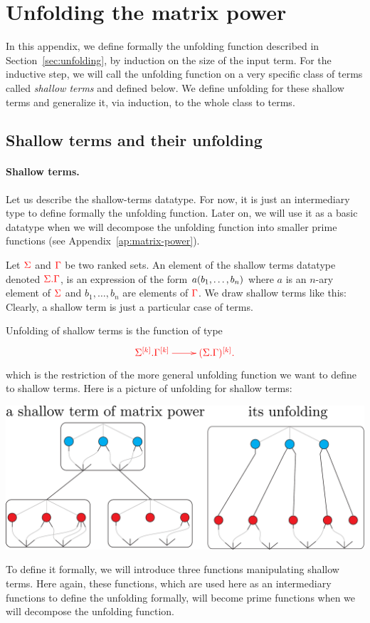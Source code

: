 \section{Unfolding the matrix power} 
\label{sec:appendix-unfold}
In this appendix, we define formally the unfolding function described in Section~\ref{sec:unfolding}, by induction on the size of the input term. For the inductive step, we will call the unfolding function on a very specific class of terms called \emph{shallow terms} and defined below. We define unfolding for these shallow terms and generalize it, via induction, to the whole class to terms.

\subsection{Shallow terms and their unfolding}\label{sec:shallow-terms}

\paragraph*{Shallow terms.} Let us describe the shallow-terms datatype. For now, it is just an intermediary type to define formally the unfolding function. Later on, we will use it as a basic datatype when we will decompose the unfolding function into smaller prime functions (see Appendix~\ref{ap:matrix-power}). 

 Let ${\color{red}{\Sigma}}$ and ${\color{red}{\Gamma}}$ be two ranked sets. An element of the shallow terms datatype denoted ${\color{red}{{\color{red}{\Sigma}}. {\color{red}{\Gamma}}}}$, is an expression of the form $a(b_1,\dots,b_n)$ where $a$ is an $n$-ary element of ${\color{red}{\Sigma}}$ and $b_1,\dots, b_n$ are elements of ${\color{red}{\Gamma}}$. We draw shallow terms like this:
Clearly, a shallow term is just a particular case of terms.


Unfolding of shallow terms is the function of type 
\begin{align*}
    \ranked{
        \xymatrix{
            \shallowterm{\mati k \rSigma} {\mati k \rGamma}  \ar[r] & \mati k {(\shallowterm \Sigma \Gamma)}.
        }
    }
\end{align*}
which is the restriction of the more general unfolding function we want to define to shallow terms. Here is a picture of unfolding for shallow terms:
\begin{center}
\includegraphics[scale=.17]{pictures/shallow-term-unfold}
\end{center}
To define it formally, we will introduce three functions manipulating shallow terms. Here again, these functions, which are used here as an intermediary functions to define the unfolding formally, will become prime functions when we will decompose the unfolding function.

